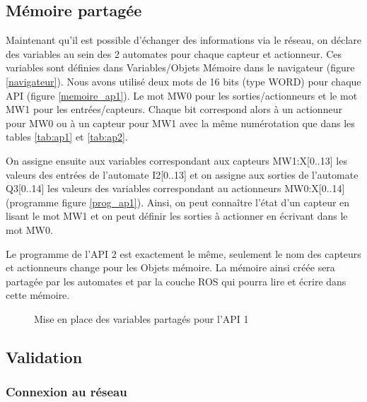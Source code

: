 \documentclass[a4paper,french, titlepage]{book}
\begin{document}
\subsection{Mémoire partagée}

Maintenant qu'il est possible d'échanger des informations via le réseau, on déclare des variables au sein des 2 automates pour chaque capteur et actionneur. Ces variables sont définies dans Variables/Objets Mémoire dans le navigateur (figure \ref{navigateur}). Nous avons utilisé deux mots de 16 bits (type WORD) pour chaque API (figure \ref{memoire_ap1}). Le mot MW0 pour les sorties/actionneurs et le mot MW1 pour les entrées/capteurs. Chaque bit correspond alors à un actionneur pour MW0 ou à un capteur pour MW1 avec la même numérotation que dans les tables \ref{tab:ap1} et \ref{tab:ap2}.

On assigne ensuite aux variables correspondant aux capteurs MW1:X[0..13] les valeurs des entrées de l'automate I2[0..13] et on assigne aux sorties de l'automate Q3[0..14] les valeurs des variables correspondant au actionneurs MW0:X[0..14] (programme figure \ref{prog_ap1}). Ainsi, on peut connaître l'état d'un capteur en lisant le mot MW1 et on peut définir les sorties à actionner en écrivant dans le mot MW0.

Le programme de l'API 2 est exactement le même, seulement le nom des capteurs et actionneurs change pour les Objets mémoire. La mémoire ainsi créée sera partagée par les automates et par la couche ROS qui pourra lire et écrire dans cette mémoire.


\begin{figure}[H] 
  \centering
  \hspace{20pt}
  \hspace{20pt}
  \caption{Mise en place des variables partagés pour l'API 1}
  \label{config_ap12}
\end{figure}

\subsection{Validation}

\subsubsection{Connexion au réseau}
\end{document}
